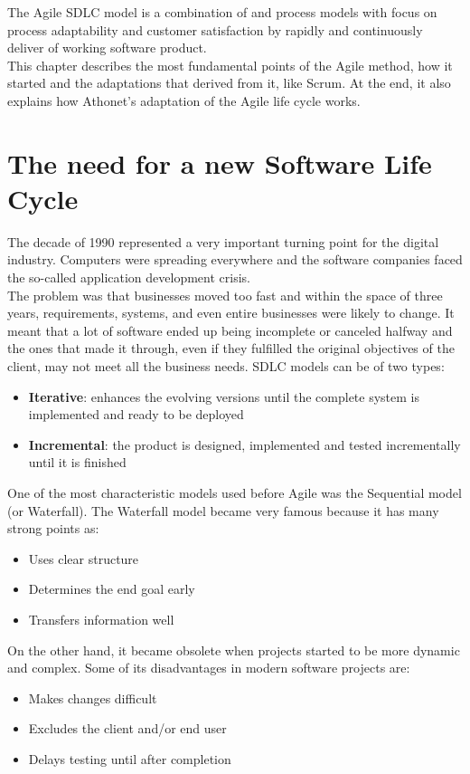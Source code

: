 The Agile SDLC model is a combination of  and  process models with focus on process adaptability and customer satisfaction by rapidly and continuously deliver of working software product\cite{sdlc_agile_model}.\\
This chapter describes the most fundamental points of the Agile method, how it started and the adaptations that derived from it, like Scrum.
At the end, it also explains how Athonet's adaptation of the Agile life cycle works.

\section{The need for a new Software Life Cycle}
	The decade of 1990 represented a very important turning point for the digital industry.
	Computers were spreading everywhere and the software companies faced the so-called application development crisis.\\
	The problem was that businesses moved too fast and within the space of three years, requirements, systems, and even entire businesses were likely to change. 
	It meant that a lot of software ended up being incomplete or canceled halfway and the ones that made it through, even if they fulfilled the original objectives of the client, may not meet all the business needs\cite{agility-beyond-history}.
	SDLC models can be of two types:
	\begin{itemize}
		\item \textbf{Iterative}: enhances the evolving versions until the complete system is implemented and ready to be deployed
		\item \textbf{Incremental}: the product is designed, implemented and tested incrementally until it is finished
	\end{itemize}
	One of the most characteristic models used before Agile was the Sequential model (or Waterfall).
	The Waterfall model became very famous because it has many strong points as:
	\begin{itemize}
		\item Uses clear structure
		\item Determines the end goal early
		\item Transfers information well
	\end{itemize}
	On the other hand, it became obsolete when projects started to be more dynamic and complex.
	Some of its disadvantages in modern software projects are:
	\begin{itemize}
		\item Makes changes difficult
		\item Excludes the client and/or end user
		\item Delays testing until after completion
	\end{itemize}
